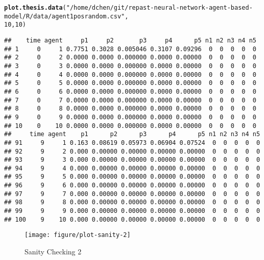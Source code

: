 \documentclass{article}\usepackage[]{graphicx}\usepackage[]{color}
\makeatletter
\def\maxwidth{ %
  \ifdim\Gin@nat@width>\linewidth
    \linewidth
  \else
    \Gin@nat@width
  \fi
}
\newcommand{\hlnum}[1]{\textcolor[rgb]{0.686,0.059,0.569}{#1}}%
\newcommand{\hlstr}[1]{\textcolor[rgb]{0.192,0.494,0.8}{#1}}%
\newcommand{\hlstd}[1]{\textcolor[rgb]{0.345,0.345,0.345}{#1}}%
\newcommand{\hlkwd}[1]{\textcolor[rgb]{0.737,0.353,0.396}{\textbf{#1}}}%
\newenvironment{kframe}{%
 \def\at@end@of@kframe{}%
 \ifinner\ifhmode%
  \def\at@end@of@kframe{\end{minipage}}%
  \begin{minipage}{\columnwidth}%
 \fi\fi%
 \def\FrameCommand##1{\hskip\@totalleftmargin \hskip-\fboxsep
 \colorbox{shadecolor}{##1}\hskip-\fboxsep
     \hskip-\linewidth \hskip-\@totalleftmargin \hskip\columnwidth}%
 \MakeFramed {\advance\hsize-\width
   \@totalleftmargin\z@ \linewidth\hsize
   \@setminipage}}%
 {\par\unskip\endMakeFramed%
 \at@end@of@kframe}
\newenvironment{knitrout}{}{} %
\makeatother
\begin{document}
\begin{knitrout}
\color{fgcolor}\begin{kframe}
\begin{alltt}
\hlkwd{plot.thesis.data}\hlstd{(}\hlstr{"/home/dchen/git/repast-neural-network-agent-based-model/R/data/agent1posrandom.csv"}\hlstd{,}
    \hlnum{10}\hlstd{,} \hlnum{10}\hlstd{)}
\end{alltt}
\begin{verbatim}
##    time agent     p1     p2       p3     p4      p5 n1 n2 n3 n4 n5
## 1     0     1 0.7751 0.3028 0.005046 0.3107 0.09296  0  0  0  0  0
## 2     0     2 0.0000 0.0000 0.000000 0.0000 0.00000  0  0  0  0  0
## 3     0     3 0.0000 0.0000 0.000000 0.0000 0.00000  0  0  0  0  0
## 4     0     4 0.0000 0.0000 0.000000 0.0000 0.00000  0  0  0  0  0
## 5     0     5 0.0000 0.0000 0.000000 0.0000 0.00000  0  0  0  0  0
## 6     0     6 0.0000 0.0000 0.000000 0.0000 0.00000  0  0  0  0  0
## 7     0     7 0.0000 0.0000 0.000000 0.0000 0.00000  0  0  0  0  0
## 8     0     8 0.0000 0.0000 0.000000 0.0000 0.00000  0  0  0  0  0
## 9     0     9 0.0000 0.0000 0.000000 0.0000 0.00000  0  0  0  0  0
## 10    0    10 0.0000 0.0000 0.000000 0.0000 0.00000  0  0  0  0  0
##     time agent    p1      p2      p3      p4      p5 n1 n2 n3 n4 n5
## 91     9     1 0.163 0.08619 0.05973 0.06904 0.07524  0  0  0  0  0
## 92     9     2 0.000 0.00000 0.00000 0.00000 0.00000  0  0  0  0  0
## 93     9     3 0.000 0.00000 0.00000 0.00000 0.00000  0  0  0  0  0
## 94     9     4 0.000 0.00000 0.00000 0.00000 0.00000  0  0  0  0  0
## 95     9     5 0.000 0.00000 0.00000 0.00000 0.00000  0  0  0  0  0
## 96     9     6 0.000 0.00000 0.00000 0.00000 0.00000  0  0  0  0  0
## 97     9     7 0.000 0.00000 0.00000 0.00000 0.00000  0  0  0  0  0
## 98     9     8 0.000 0.00000 0.00000 0.00000 0.00000  0  0  0  0  0
## 99     9     9 0.000 0.00000 0.00000 0.00000 0.00000  0  0  0  0  0
## 100    9    10 0.000 0.00000 0.00000 0.00000 0.00000  0  0  0  0  0
\end{verbatim}
\end{kframe}\begin{figure}[]

\texttt{[image: figure/plot-sanity-2]} \caption[Sanity Checking 2]{Sanity Checking 2\label{fig:plot-sanity-2}}
\end{figure}


\end{knitrout}


\newpage
\end{document}

